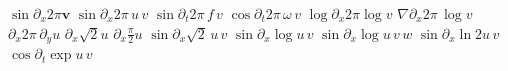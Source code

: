 \documentclass{article}
\begin{document}
$\sin\partial_x 2\pi\mathbf{v}$ $\sin\partial_x 2\pi\,u\,v$ $\sin\partial_t 2\pi\,f\,v$ $\cos\partial_t 2\pi\,\omega\,v$ $\log\partial_x 2\pi\log v$
$\nabla\partial_x 2\pi\,\log v$ $\partial_x 2\pi\,\partial_y u$ $\partial_x\sqrt2 u$ $\partial_x\frac{\pi}{2}u$ $\sin\partial_x\sqrt2\,u\,v$
$\sin\partial_x\log u\,v$ $\sin\partial_x\log u\,v\,w$ $\sin\partial_x\ln 2u\,v$ $\cos\partial_t\exp u\,v$
\end{document}

